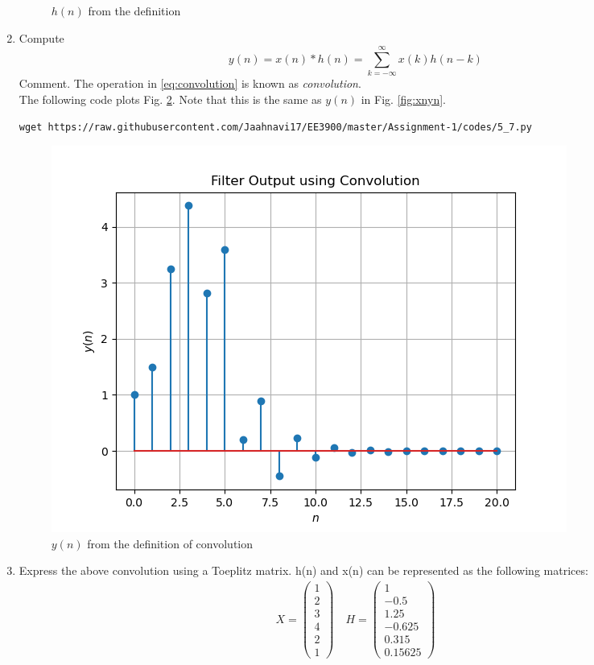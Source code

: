 \documentclass[journal,12pt,twocolumn]{IEEEtran}
\renewcommand\thesection{\arabic{section}}
\begin{document}
\begin{enumerate}[label=\thesection.\arabic*]
\begin{figure}[!ht]
\caption{$h(n)$ from the definition}
\label{fig:hndef}
\end{figure}
%
\item Compute 
%
\begin{equation}
\label{eq:convolution}
y(n) = x(n)*h(n) = \sum_{k=-\infty}^{\infty}x(k)h(n-k)
\end{equation}
%
Comment. The operation in \eqref{eq:convolution} is known as
{\em convolution}.
%
\\
\solution The following code plots Fig. \ref{fig:ynconv}. Note that this is the same as 
$y(n)$ in  Fig. 
\ref{fig:xnyn}. 
%
\begin{lstlisting}
wget https://raw.githubusercontent.com/Jaahnavi17/EE3900/master/Assignment-1/codes/5_7.py
\end{lstlisting}
\begin{figure}[!ht]
\centering
\includegraphics[width=\columnwidth]{figures/Figure_5.png}
\caption{$y(n)$ from the definition of convolution}
\label{fig:ynconv}
\end{figure}
\item Express the above convolution using a Toeplitz matrix.
\solution h(n) and x(n) can be represented as the following matrices:
\begin{align}
    X=\begin{pmatrix}1\\2\\3\\4\\2\\1
    \end{pmatrix}\quad
    H = \begin{pmatrix}1\\-0.5\\1.25\\-0.625\\0.315\\0.15625

\end{pmatrix}
\end{align}
\end{enumerate}
\end{document}
